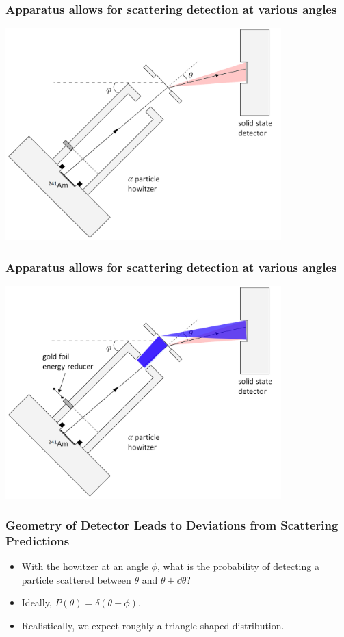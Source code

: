 \documentclass{beamer}
\begin{document}
\begin{frame}
  \frametitle{Apparatus allows for scattering detection at various angles}
  \begin{center}
  \includegraphics[width=0.8\textwidth]{apparatus-width1}
\end{center}
\end{frame}

\begin{frame}
  \frametitle{Apparatus allows for scattering detection at various angles}
  \begin{center}
  \includegraphics[width=0.8\textwidth]{apparatus-width}
\end{center}
\end{frame}


\begin{frame}
  \frametitle{Geometry of Detector Leads to Deviations from Scattering Predictions}
  \begin{itemize}
    \item With the howitzer at an angle $\phi$, what is the probability of detecting a particle scattered between $\theta$ and $\theta + \dd{\theta}$?
      \pause
    \item Ideally, $P(\theta) = \delta(\theta-\phi)$.
      \pause
    \item Realistically, we expect roughly a triangle-shaped distribution.

  \end{itemize}
    \end{frame}
\end{document}
